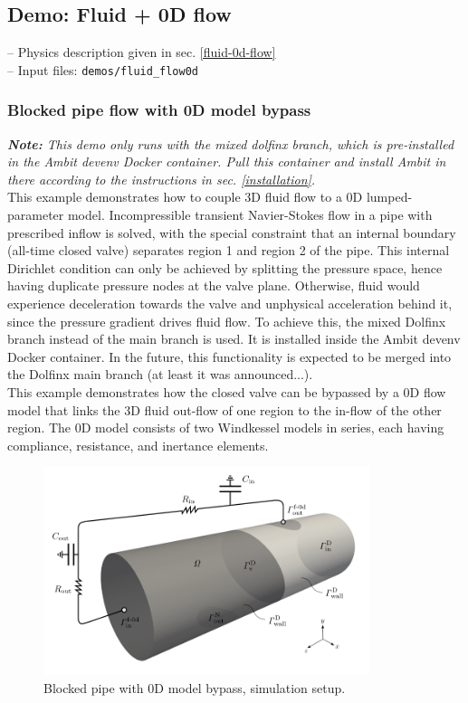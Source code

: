 \documentclass[a4paper,12pt]{report}
\begin{document}
\subsection{Demo: Fluid + 0D flow}\label{demo-fluid-0d-flow}

-- Physics description given in sec. \ref{fluid-0d-flow}\\

-- Input files: \verb"demos/fluid_flow0d"

\subsubsection*{Blocked pipe flow with 0D model bypass}

\textit{\textbf{Note:} This demo only runs with the mixed dolfinx branch, which is pre-installed in the Ambit devenv Docker container. Pull this container and install Ambit in there according to the instructions in sec. \ref{installation}.}\\

This example demonstrates how to couple 3D fluid flow to a 0D lumped-parameter model. Incompressible transient Navier-Stokes flow in a pipe with prescribed inflow is solved,
with the special constraint that an internal boundary (all-time closed valve) separates region 1 and region 2 of the pipe. This internal Dirichlet condition can only be achieved
by splitting the pressure space, hence having duplicate pressure nodes at the valve plane. Otherwise, fluid would experience deceleration towards the valve and unphysical acceleration behind it, since the pressure gradient drives fluid flow. To achieve this, the mixed Dolfinx branch instead of the main branch is used. It is installed inside the Ambit devenv Docker
container. In the future, this functionality is expected to be merged into the Dolfinx main branch (at least it was announced...).\\

This example demonstrates how the closed valve can be bypassed by a 0D flow model that links the 3D fluid out-flow of one region to the in-flow of the other region. The 0D model consists of two Windkessel models in series, each having compliance, resistance, and inertance elements.

\begin{figure}
\centering
\includegraphics[width=0.85\textwidth]{fig/pipe_0d_setup.png}
\caption{Blocked pipe with 0D model bypass, simulation setup.}
\label{fig:pipe_0d_setup}
\end{figure}
\end{document}
